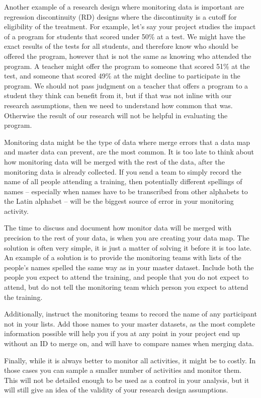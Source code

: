 Another example of a research design where monitoring data is important
are regression discontinuity (RD) designs
where the discontinuity is a cutoff for eligibility of the treatment. 
For example, 
let's say your project studies the impact of a program for students that scored under 50\% at a test.
We might have the exact results of the tests for all students, 
and therefore know who should be offered the program, 
however that is not the same as knowing who attended the program. 
A teacher might offer the program to someone that scored 51\% at the test,
and someone that scored 49\% at the might decline to participate in the program.
We should not pass judgment on a teacher that offers a program to a student
they think can benefit from it, 
but if that was not inline with our research assumptions,
then we need to understand how common that was.
Otherwise the result of our research will not be helpful
in evaluating the program.

Monitoring data might be the type of data 
where merge errors that a data map and master data can prevent,
are the most common.
It is too late to think about how monitoring data will be merged
with the rest of the data, after the monitoring data is already collected.
If you send a team to simply record the name of all people attending a training,
then potentially different spellings of names 
-- especially when names have to be transcribed from other alphabets to the Latin alphabet --
will be the biggest source of error in your monitoring activity.

The time to discuss and document how monitor data will be merged with precision
to the rest of your data, is when you are creating your data map.
The solution is often very simple, it is just a matter of solving it before it is too late.
An example of a solution is to provide the monitoring teams 
with lists of the people's names spelled the same way as in your master dataset. 
Include both the people you expect to attend the training,
and people that you do not expect to attend,
but do not tell the monitoring team which person you expect to attend the training.

Additionally, instruct the monitoring teams to record the name of any
participant not in your lists. 
Add those names to your master datasets, 
as the most complete information possible will help you 
if you at any point in your project end up without an ID to merge on,
and will have to compare names when merging data.

Finally, while it is always better to monitor all activities,
it might be to costly. 
In those cases you can sample a smaller number of activities
and monitor them.
This will not be detailed enough to be used as a control in your analysis,
but it will still give an idea of the validity of your research design assumptions.



